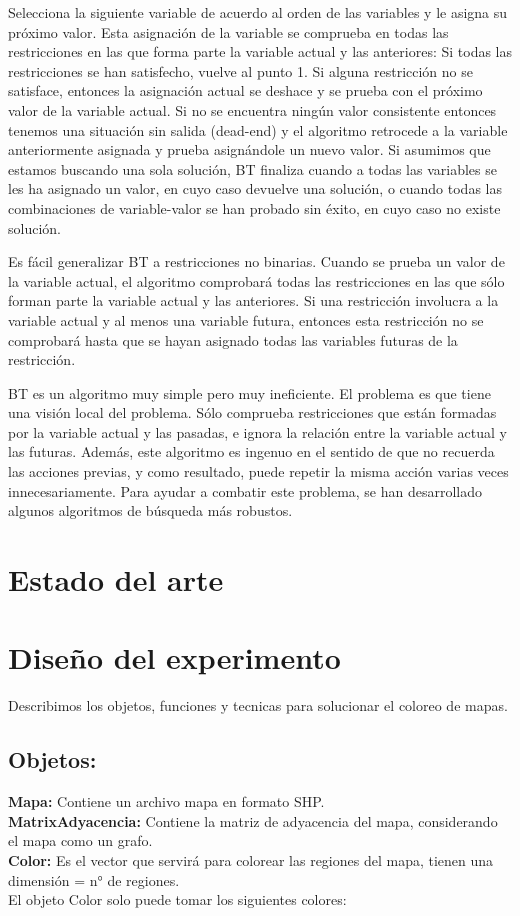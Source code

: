 \documentclass[a4paper]{article}
\begin{document}
Selecciona la siguiente variable de acuerdo al orden de las variables y le asigna su próximo valor. 
Esta asignación de la variable se comprueba en todas las restricciones en las que forma parte la variable actual y las anteriores:
Si todas las restricciones se han satisfecho, vuelve al punto 1.
Si alguna restricción no se satisface, entonces la asignación actual se deshace y se prueba con el próximo valor de la variable actual. 
Si no se encuentra ningún valor consistente entonces tenemos una situación sin salida (dead-end) y el algoritmo retrocede a la variable anteriormente asignada y prueba asignándole un nuevo valor.
Si asumimos que estamos buscando una sola solución, BT finaliza cuando a todas las variables se les ha asignado un valor, en cuyo caso devuelve una solución, o cuando todas las combinaciones de variable-valor se han probado sin éxito, en cuyo caso no existe solución.

Es fácil generalizar BT a restricciones no binarias. Cuando se prueba un valor de la variable actual, el algoritmo comprobará todas las restricciones en las que sólo forman parte la variable actual y las anteriores. Si una restricción involucra a la variable actual y al menos una variable futura, entonces esta restricción no se comprobará hasta que se hayan asignado todas las variables futuras de la restricción.

BT es un algoritmo muy simple pero muy ineficiente. El problema es que tiene una visión local del problema. Sólo comprueba restricciones que están formadas por la variable actual y las pasadas, e ignora la relación entre la variable actual y las futuras. Además, este algoritmo es ingenuo en el sentido de que no recuerda las acciones previas, y como resultado, puede repetir la misma acción varias veces innecesariamente. Para ayudar a combatir este problema, se han desarrollado algunos algoritmos de búsqueda más robustos.

 

\section{Estado del arte}


\pagebreak
\section{Diseño del experimento}
Describimos los objetos, funciones y tecnicas para solucionar el coloreo de mapas.
\subsection*{Objetos:}
\textbf{Mapa:} Contiene un archivo mapa en formato SHP.\\ 
\textbf{MatrixAdyacencia:} Contiene la matriz de adyacencia del mapa, considerando el mapa como un grafo.\\
\textbf{Color:} Es el vector que servirá para colorear las regiones del mapa, tienen una dimensión = n° de regiones.\\ 
El objeto Color solo puede tomar los siguientes colores:
\end{document}
